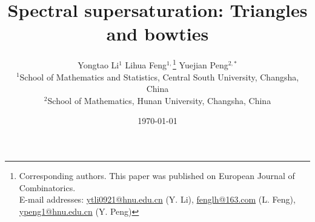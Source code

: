 \documentclass[11pt]{article}
\begin{document}
\title{Spectral supersaturation: Triangles and bowties}





\author{Yongtao Li$^{1}$ 
\quad  
Lihua Feng$^{1,}$\footnote{Corresponding authors. This paper was published on European Journal of Combinatorics. \\ 
E-mail addresses:  \url{ytli0921@hnu.edu.cn} (Y. Li), 
\url{fenglh@163.com} (L. Feng), 
\url{ypeng1@hnu.edu.cn} (Y. Peng)}  
\quad 
Yuejian Peng$^{2,*}$  \\
{\small $^{1}$School of Mathematics and Statistics,  Central South University,  Changsha, China} \\ 
 {\small $^{2}$School of Mathematics, Hunan University, Changsha, China}  
 }


\date{\today}
 
\maketitle


\vspace{-0.8cm}
\end{document}
